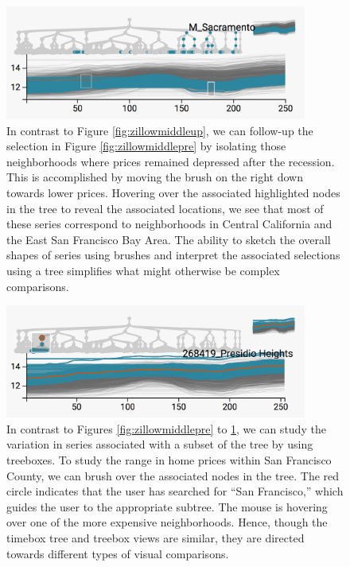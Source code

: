 \documentclass[12pt]{article}
\begin{document}
\begin{figure}

{\centering \includegraphics[width=375px]{figure/zillow_middle_down}

}

\caption{In contrast to Figure \ref{fig:zillowmiddleup}, we can follow-up the
  selection in Figure \ref{fig:zillowmiddlepre} by isolating those neighborhoods
  where prices remained depressed after the recession. This is accomplished by
  moving the brush on the right down towards lower prices. Hovering over the
  associated highlighted nodes in the tree to reveal the associated locations,
  we see that most of these series correspond to neighborhoods in Central
  California and the East San Francisco Bay Area. The ability to sketch the
  overall shapes of series using brushes and interpret the associated selections
  using a tree simplifies what might otherwise be complex
  comparisons.}\label{fig:zillowmiddledown}
\end{figure}

\begin{figure}

{\centering \includegraphics[width=375px]{figure/zillow_sf}

}

\caption{In contrast to Figures \ref{fig:zillowmiddlepre} to
  \ref{fig:zillowmiddledown}, we can study the variation in series associated
  with a subset of the tree by using treeboxes. To study the range in home
  prices within San Francisco County, we can brush over the associated nodes in
  the tree. The red circle indicates that the user has searched for ``San
  Francisco,'' which guides the user to the appropriate subtree. The mouse is
  hovering over one of the more expensive neighborhoods. Hence, though the
  timebox tree and treebox views are similar, they are directed towards
  different types of visual comparisons.}\label{fig:zillowsf}
\end{figure}
\end{document}
